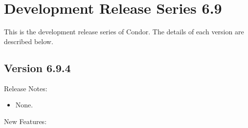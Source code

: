 
\section{\label{sec:History-6-9}Development Release Series 6.9}

This is the development release series of Condor.
The details of each version are described below.

\subsection*{\label{sec:New-6-9-4}Version 6.9.4}

\noindent Release Notes:

\begin{itemize}

\item None.

\end{itemize}


\noindent New Features:


